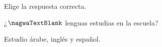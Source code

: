 
\begin{question}

\begin{instance}
  
\begin{mcq}[standalone=false]
    
\begin{stem}
      Elige la respuesta correcta.\par     
\begin{enumerationnolabel}
\item{¿$\nagwaTextBlank$ lenguas estudias en la escuela?}  \item{Estudio árabe, inglés y español.}
\end{enumerationnolabel}
    
\end{stem}
    
\begin{distractors}
\end{distractors}
              
\end{mcq}

\end{instance}

\end{question}
